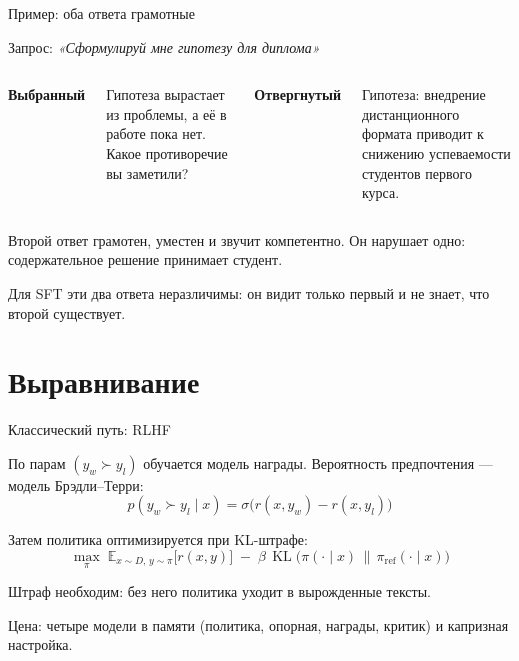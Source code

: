 \documentclass[11pt,aspectratio=169]{beamer}
\newcommand{\key}[1]{%
  \begin{center}\colorbox{boxbg}{\parbox{0.92\textwidth}{\vspace{2pt}#1\vspace{2pt}}}\end{center}}
\newcommand{\aside}[1]{{\color{dim}\small #1}}
\newcommand{\E}{\mathbb{E}}
\newcommand{\KL}{\operatorname{KL}}
\begin{document}
\begin{frame}{Пример: оба ответа грамотные}

\small
Запрос: \textit{«Сформулируй мне гипотезу для диплома»}

\vspace{0.8em}
\begin{columns}[t]
\textbf{\color{acc}Выбранный}

\vspace{0.3em}
\colorbox{boxbg}{\parbox{0.95\textwidth}{\vspace{2pt}\footnotesize
Гипотеза вырастает из проблемы, а её в работе пока нет. Какое
противоречие вы заметили?\vspace{2pt}}}

\textbf{\color{acc}Отвергнутый}

\vspace{0.3em}
\colorbox{boxbg}{\parbox{0.95\textwidth}{\vspace{2pt}\footnotesize
Гипотеза: внедрение дистанционного формата приводит к снижению
успеваемости студентов первого курса.\vspace{2pt}}}
\end{columns}

\vspace{1.2em}
\normalsize
Второй ответ грамотен, уместен и звучит компетентно. Он нарушает одно:
содержательное решение принимает студент.

\vspace{0.8em}
\key{Для SFT эти два ответа неразличимы: он видит только первый и не
знает, что второй существует.}

\end{frame}

\section{Выравнивание}

\begin{frame}{Классический путь: RLHF}

По парам $(y_w \succ y_l)$ обучается модель награды. Вероятность
предпочтения — модель Брэдли–Терри:
\[
p(y_w \succ y_l \mid x) = \sigma\big(r(x,y_w) - r(x,y_l)\big)
\]

Затем политика оптимизируется при KL-штрафе:
\[
\max_{\pi}\;
\E_{x\sim D,\,y\sim\pi}\big[r(x,y)\big]
\;-\;\beta\,\KL\!\big(\pi(\cdot\mid x)\,\|\,\pi_{\text{ref}}(\cdot\mid x)\big)
\]

\vspace{0.5em}
Штраф необходим: без него политика уходит в вырожденные тексты.

\vspace{0.5em}
\aside{Цена: четыре модели в памяти (политика, опорная, награды, критик)
и капризная настройка.}

\end{frame}
\end{document}
